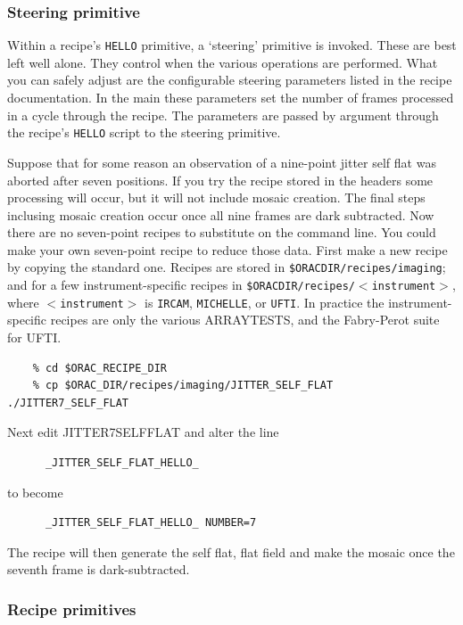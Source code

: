 \documentclass[twoside,11pt]{article}
\newcommand{\htmlref}[2]{#1}
\newcommand{\xlabel}[1]{}
\renewcommand{\_}{\texttt{\symbol{95}}}
\begin{document}
\subsubsection{\xlabel{steering_primitive}Steering
primitive\label{steering_primitive}}

Within a recipe's {\tt\_HELLO} primitive, a `steering' primitive is invoked.
These are best left well alone.  They control when the various
operations are performed.  What you can safely adjust are the
configurable steering parameters listed in the recipe documentation.
In the main these parameters set the number of frames processed in a
cycle through the recipe.  The parameters are passed by argument
through the recipe's {\tt\_HELLO} script to the steering primitive.

Suppose that for some reason an observation of a nine-point jitter
self flat was aborted after seven positions.  If you try the recipe
stored in the headers some processing will occur, but it will not
include mosaic creation.  The final steps inclusing mosaic creation
occur once all nine frames are dark subtracted.  Now there are no
seven-point recipes to substitute on the command line.  You could make
your own seven-point recipe to reduce those data.  First make a new
recipe by copying the standard one.  Recipes are stored in
{\tt\$ORAC\_DIR/recipes/imaging}; and for a few instrument-specific
recipes in {\tt\$ORAC\_DIR/recipes/$<$instrument$>$}, where
{\tt$<$instrument$>$} is {\tt IRCAM}, {\tt MICHELLE}, or {\tt UFTI}.
In practice the instrument-specific recipes are only the various
\htmlref{ARRAY\_TESTS}{ARRAY\_TESTS}, and the Fabry-Perot suite
for UFTI.

\begin{verbatim}
    % cd $ORAC_RECIPE_DIR
    % cp $ORAC_DIR/recipes/imaging/JITTER_SELF_FLAT ./JITTER7_SELF_FLAT
\end{verbatim}
Next edit JITTER7\_SELF\_FLAT and alter the line

\begin{verbatim}
      _JITTER_SELF_FLAT_HELLO_
\end{verbatim}
to become

\begin{verbatim}
      _JITTER_SELF_FLAT_HELLO_ NUMBER=7
\end{verbatim}
The recipe will then generate the self flat, flat field and make the
mosaic once the seventh frame is dark-subtracted.

\subsubsection{\xlabel{recipe_primitives}Recipe primitives\label{recipe_primitives}}
\end{document}
